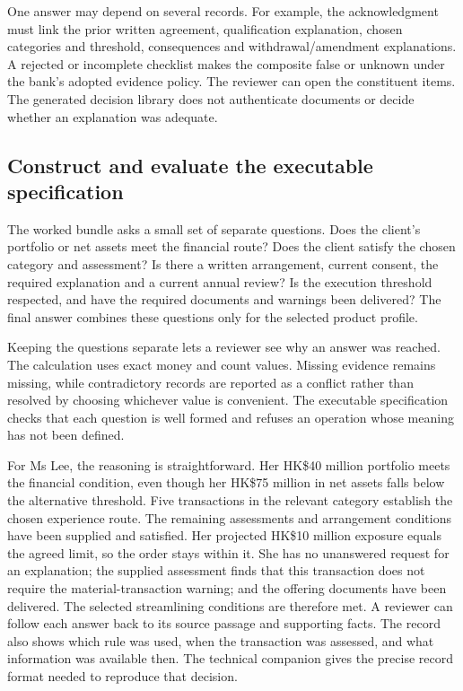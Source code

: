 One answer may depend on several records. For example, the acknowledgment must link the prior
written agreement, qualification explanation, chosen categories and threshold,
consequences and withdrawal/amendment explanations. A rejected or incomplete
checklist makes the composite false or unknown under the bank's adopted evidence
policy. The reviewer can open the constituent items. The generated decision
library does not authenticate documents or decide whether an explanation was
adequate.

\subsection{Construct and evaluate the executable specification}
\label{merge:P-01b-complete-dry-run:04}


The worked bundle asks a small set of separate questions. Does the client's
portfolio or net assets meet the financial route? Does the client satisfy the
chosen category and assessment? Is there a written arrangement, current consent,
the required explanation and a current annual review? Is the execution threshold
respected, and have the required documents and warnings been delivered? The
final answer combines these questions only for the selected product profile.

Keeping the questions separate lets a reviewer see why an answer was reached.
The calculation uses exact money and count values. Missing evidence remains
missing, while contradictory records are reported as a conflict rather than
resolved by choosing whichever value is convenient. The executable specification
checks that each question is well formed and refuses an operation whose meaning
has not been defined.

For Ms Lee, the reasoning is straightforward. Her HK\$40 million portfolio meets
the financial condition, even though her HK\$75 million in net assets falls below
the alternative threshold. Five transactions in the relevant category establish
the chosen experience route. The remaining assessments and arrangement
conditions have been supplied and satisfied. Her projected HK\$10 million
exposure equals the agreed limit, so the order stays within it. She has no
unanswered request for an explanation; the supplied assessment finds that this
transaction does not require the material-transaction warning; and the offering
documents have been delivered. The selected streamlining conditions are
therefore met. A reviewer can follow
each answer back to its source passage and supporting facts. The record also
shows which rule was used, when the transaction was assessed, and what
information was available then. The technical companion gives the precise
record format needed to reproduce that decision.

